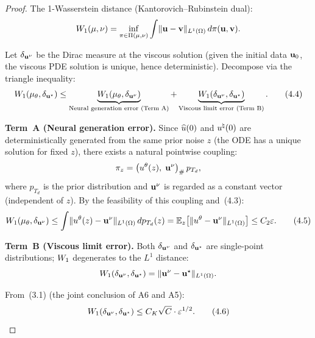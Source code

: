 \begin{proof}
The 1-Wasserstein distance (Kantorovich--Rubinstein dual):
\begin{equation}
  W_{1}(\mu, \nu) = \inf_{\pi \in \Pi(\mu,\nu)} \int \lVert \mathbf{u} - \mathbf{v} \rVert_{L^1(\Omega)} \, d\pi(\mathbf{u},\mathbf{v}).
\end{equation}

Let $\delta_{\mathbf{u}^{\nu}}$ be the Dirac measure at the viscous solution (given the initial data $\mathbf{u}_{0}$, the viscous PDE solution is unique, hence deterministic). Decompose via the triangle inequality:
\begin{equation}\label{eq:4.4}
  W_{1}(\mu_{\theta}, \delta_{\mathbf{u}^{\star}})
  \leq \underbrace{W_{1}(\mu_{\theta}, \delta_{\mathbf{u}^{\nu}})}_{\text{Neural generation error (Term~A)}}
  + \underbrace{W_{1}(\delta_{\mathbf{u}^{\nu}}, \delta_{\mathbf{u}^{\star}})}_{\text{Viscous limit error (Term~B)}}. \tag{4.4}
\end{equation}

\textbf{Term~A (Neural generation error).}
Since $\widehat{u}(0)$ and $u^{\natural}(0)$ are deterministically generated from the same prior noise $z$ (the ODE has a unique solution for fixed $z$), there exists a natural pointwise coupling:
\begin{equation}
  \pi_z = \bigl(u^{\theta}(z),\; \mathbf{u}^{\nu}\bigr)_\# \, p_{T_d},
\end{equation}
where $p_{T_d}$ is the prior distribution and $\mathbf{u}^{\nu}$ is regarded as a constant vector (independent of $z$). By the feasibility of this coupling and~(4.3):
\begin{equation}\label{eq:4.5}
  W_{1}(\mu_{\theta}, \delta_{\mathbf{u}^{\nu}})
  \leq \int \lVert u^{\theta}(z) - \mathbf{u}^{\nu} \rVert_{L^1(\Omega)} \, d p_{T_d}(z)
  = \mathbb{E}_z\bigl[\lVert u^{\theta} - \mathbf{u}^{\nu} \rVert_{L^1(\Omega)}\bigr]
  \leq C_2 \varepsilon. \tag{4.5}
\end{equation}

\textbf{Term~B (Viscous limit error).}
Both $\delta_{\mathbf{u}^{\nu}}$ and $\delta_{\mathbf{u}^{\star}}$ are single-point distributions; $W_{1}$ degenerates to the $L^1$ distance:
\begin{equation}
  W_{1}(\delta_{\mathbf{u}^{\nu}}, \delta_{\mathbf{u}^{\star}}) = \lVert \mathbf{u}^{\nu} - \mathbf{u}^{\star} \rVert_{L^1(\Omega)}.
\end{equation}

From~(3.1) (the joint conclusion of A6 and A5):
\begin{equation}\label{eq:4.6}
  W_{1}(\delta_{\mathbf{u}^{\nu}}, \delta_{\mathbf{u}^{\star}}) \leq C_K \sqrt{C} \cdot \varepsilon^{1/2}. \tag{4.6}
\end{equation}


\end{proof}
